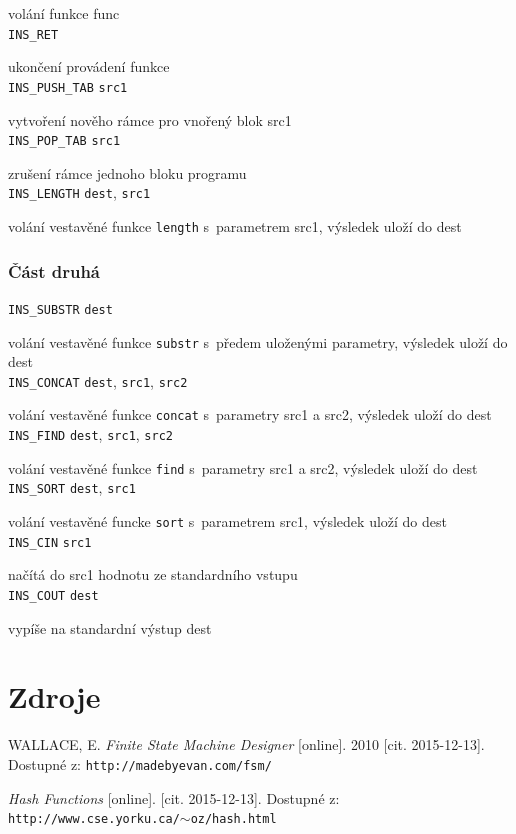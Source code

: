 \documentclass[a4paper, 12pt]{article}
\begin{document}
volání funkce func\\
\texttt{INS\_RET}

ukončení provádení funkce\\
\texttt{INS\_PUSH\_TAB} \texttt{src1}

vytvoření nověho rámce pro vnořený blok src1\\
\texttt{INS\_POP\_TAB} \texttt{src1}

zrušení rámce jednoho bloku programu\\
\texttt{INS\_LENGTH} \texttt{dest}, \texttt{src1}

volání vestavěné funkce \texttt{length} s~parametrem src1, výsledek uloží do dest\\

\newpage
\subsubsection*{Část druhá}
\texttt{INS\_SUBSTR} \texttt{dest}

volání vestavěné funkce \texttt{substr} s~předem uloženými parametry, výsledek uloží do dest\\
\texttt{INS\_CONCAT} \texttt{dest}, \texttt{src1}, \texttt{src2}

volání vestavěné funkce \texttt{concat} s~parametry src1 a src2, výsledek uloží do dest\\
\texttt{INS\_FIND} \texttt{dest}, \texttt{src1}, \texttt{src2}

volání vestavěné funkce \texttt{find} s~parametry src1 a src2, výsledek uloží do dest\\
\texttt{INS\_SORT} \texttt{dest}, \texttt{src1}

volání vestavěné funcke \texttt{sort} s~parametrem src1, výsledek uloží do dest\\
\texttt{INS\_CIN} \texttt{src1}

načítá do src1 hodnotu ze standardního vstupu\\
\texttt{INS\_COUT} \texttt{dest}

vypíše na standardní výstup dest\\

\section{Zdroje}

\begin{thebibliography}{9}

WALLACE, E.
\textit{Finite State Machine Designer}
[online]. 2010 [cit. 2015-12-13]. Dostupné z: \texttt{http://madebyevan.com/fsm/}
 
\textit{Hash Functions}
[online]. [cit. 2015-12-13]. Dostupné z:\\ \texttt{http://www.cse.yorku.ca/$\sim$oz/hash.html}
 
\end{thebibliography}
\end{document}
